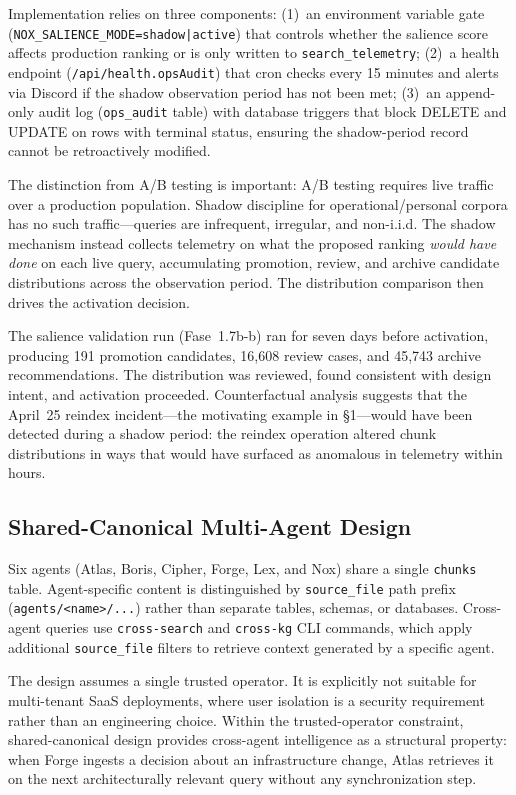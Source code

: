 Implementation relies on three components: (1)~an environment variable gate
(\texttt{NOX\_SALIENCE\_MODE=shadow|active}) that controls whether the salience score
affects production ranking or is only written to \texttt{search\_telemetry}; (2)~a health
endpoint (\texttt{/api/health.opsAudit}) that cron checks every 15 minutes and alerts via
Discord if the shadow observation period has not been met; (3)~an append-only audit log
(\texttt{ops\_audit} table) with database triggers that block DELETE and UPDATE on rows
with terminal status, ensuring the shadow-period record cannot be retroactively modified.

The distinction from A/B testing is important: A/B testing requires live traffic over a
production population. Shadow discipline for operational/personal corpora has no such
traffic---queries are infrequent, irregular, and non-i.i.d. The shadow mechanism instead
collects telemetry on what the proposed ranking \emph{would have done} on each live query,
accumulating promotion, review, and archive candidate distributions across the observation
period. The distribution comparison then drives the activation decision.

The salience validation run (Fase~1.7b-b) ran for seven days before activation, producing
191 promotion candidates, 16,608 review cases, and 45,743 archive recommendations. The
distribution was reviewed, found consistent with design intent, and activation proceeded.
Counterfactual analysis suggests that the April~25 reindex incident---the motivating example
in \S1---would have been detected during a shadow period: the reindex operation altered
chunk distributions in ways that would have surfaced as anomalous in telemetry within hours.

\subsection{Shared-Canonical Multi-Agent Design}

Six agents (Atlas, Boris, Cipher, Forge, Lex, and Nox) share a single \texttt{chunks}
table. Agent-specific content is distinguished by \texttt{source\_file} path prefix
(\texttt{agents/<name>/...}) rather than separate tables, schemas, or databases.
Cross-agent queries use \texttt{cross-search} and \texttt{cross-kg} CLI commands, which
apply additional \texttt{source\_file} filters to retrieve context generated by a specific
agent.

The design assumes a single trusted operator. It is explicitly not suitable for
multi-tenant SaaS deployments, where user isolation is a security requirement rather than
an engineering choice. Within the trusted-operator constraint, shared-canonical design
provides cross-agent intelligence as a structural property: when Forge ingests a decision
about an infrastructure change, Atlas retrieves it on the next architecturally relevant
query without any synchronization step.

